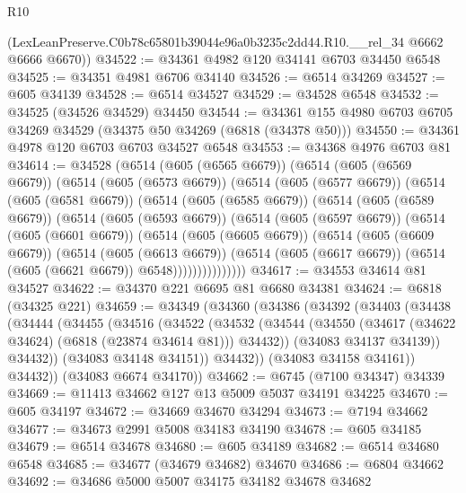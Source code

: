 \begin{lexlean}{R10}
\begin{coremodule}
      (LexLeanPreserve.C0b78c65801b39044e96a0b3235c2dd44.R10.__rel_34 @6662 @6666 @6670))
@34522 := @34361 @4982 @120 @34141 @6703 @34450 @6548
@34525 := @34351 @4981 @6706 @34140
@34526 := @6514 @34269
@34527 := @605 @34139
@34528 := @6514 @34527
@34529 := @34528 @6548
@34532 := @34525 (@34526 @34529) @34450
@34544 := @34361 @155 @4980 @6703 @6705 @34269 @34529 (@34375 @50 @34269 (@6818 (@34378 @50)))
@34550 := @34361 @4978 @120 @6703 @6703 @34527 @6548
@34553 := @34368 @4976 @6703 @81
@34614 := @34528
    (@6514
      (@605 (@6565 @6679))
      (@6514
        (@605 (@6569 @6679))
        (@6514
          (@605 (@6573 @6679))
          (@6514
            (@605 (@6577 @6679))
            (@6514
              (@605 (@6581 @6679))
              (@6514
                (@605 (@6585 @6679))
                (@6514
                  (@605 (@6589 @6679))
                  (@6514
                    (@605 (@6593 @6679))
                    (@6514
                      (@605 (@6597 @6679))
                      (@6514
                        (@605 (@6601 @6679))
                        (@6514
                          (@605 (@6605 @6679))
                          (@6514
                            (@605 (@6609 @6679))
                            (@6514
                              (@605 (@6613 @6679))
                              (@6514
                                (@605 (@6617 @6679))
                                (@6514 (@605 (@6621 @6679)) @6548)))))))))))))))
@34617 := @34553 @34614 @81 @34527
@34622 := @34370 @221 @6695 @81 @6680 @34381
@34624 := @6818 (@34325 @221)
@34659 := @34349
    (@34360
      (@34386
        (@34392
          (@34403
            (@34438
              (@34444
                (@34455
                  (@34516
                    (@34522
                      (@34532
                        (@34544
                          (@34550 (@34617 (@34622 @34624) (@6818 (@23874 @34614 @81))) @34432))
                        (@34083 @34137 @34139))
                      @34432))
                  (@34083 @34148 @34151))
                @34432))
            (@34083 @34158 @34161))
          @34432))
      (@34083 @6674 @34170))
@34662 := @6745 (@7100 @34347) @34339
@34669 := @11413 @34662 @127 @13 @5009 @5037 @34191 @34225
@34670 := @605 @34197
@34672 := @34669 @34670 @34294
@34673 := @7194 @34662
@34677 := @34673 @2991 @5008 @34183 @34190
@34678 := @605 @34185
@34679 := @6514 @34678
@34680 := @605 @34189
@34682 := @6514 @34680 @6548
@34685 := @34677 (@34679 @34682) @34670
@34686 := @6804 @34662
@34692 := @34686 @5000 @5007 @34175 @34182 @34678 @34682

\end{coremodule}
\end{lexlean}
